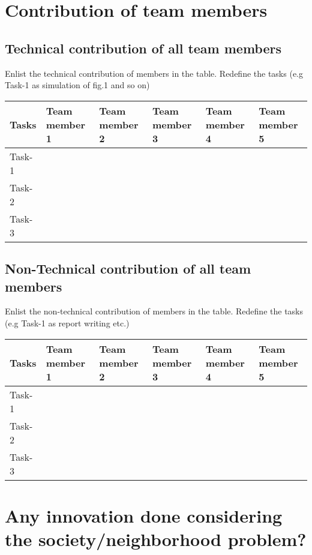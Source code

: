 \documentclass{article}
\begin{document}
\section{Contribution of team members}	
\subsection{Technical contribution of all team members }
Enlist the technical contribution of members in the table. Redefine the tasks (e.g Task-1 as simulation of fig.1 and so on)
\begin{table}[h]
\centering
\begin{tabular}{|l|l|l|l|l|l|}
\hline
Tasks  & Team member 1 & Team member 2 & Team member 3 & Team member 4 & Team member 5 \\ \hline
Task-1 &               &               &               &               &               \\ \hline
Task-2 &               &               &               &               &               \\ \hline
Task-3 &               &               &               &               &               \\ \hline
\end{tabular}
\end{table}
\subsection{Non-Technical contribution of all team members }
Enlist the non-technical contribution of members in the table. Redefine the tasks (e.g Task-1 as report writing etc.)
\begin{table}[h]
\centering
\begin{tabular}{|l|l|l|l|l|l|}
\hline
Tasks  & Team member 1 & Team member 2 & Team member 3 & Team member 4 & Team member 5 \\ \hline
Task-1 &               &               &               &               &               \\ \hline
Task-2 &               &               &               &               &               \\ \hline
Task-3 &               &               &               &               &               \\ \hline
\end{tabular}
\end{table}

\section{Any innovation done considering the society/neighborhood problem?}
\end{document}

